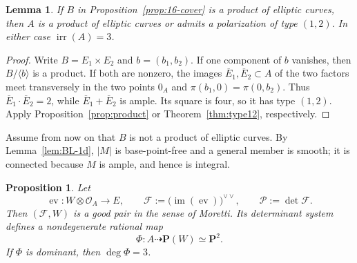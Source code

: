 \documentclass[12pt]{amsart}
\numberwithin{equation}{section}
\newtheorem{proposition}[theorem]{Proposition}
\newtheorem{lemma}[theorem]{Lemma}
\theoremstyle{definition}
\theoremstyle{remark}
\newcommand{\PP}{\mathbf P}
\newcommand{\irr}{\operatorname{irr}}
\begin{document}
\begin{lemma}\label{lem:16-product-cover}
If $B$ in Proposition~\ref{prop:16-cover} is a product of elliptic
curves, then $A$ is a product of elliptic curves or admits a
polarization of type $(1,2)$.  In either case $\irr(A)=3$.
\end{lemma}

\begin{proof}
Write $B=E_1\times E_2$ and $b=(b_1,b_2)$.  If one component of $b$
vanishes, then $B/\langle b\rangle$ is a product.  If both are nonzero,
the images $\overline E_1,\overline E_2\subset A$ of the two factors
meet transversely in the two points
$0_A$ and $\pi(b_1,0)=\pi(0,b_2)$.  Thus
$\overline E_1\cdot\overline E_2=2$, while
$\overline E_1+\overline E_2$ is ample.  Its square is four, so it has
type $(1,2)$.  Apply Proposition~\ref{prop:product} or
Theorem~\ref{thm:type12}, respectively.
\end{proof}

Assume from now on that $B$ is not a product of elliptic curves.  By
Lemma~\ref{lem:BL-1d}, $|M|$ is base-point-free and a general member is
smooth; it is connected because $M$ is ample, and hence is integral.

\begin{proposition}\label{prop:16-good-pair}
Let
\[
 \operatorname{ev}:W\otimes\mathcal O_A\longrightarrow E,
 \qquad
 \mathcal F:=\bigl(\operatorname{im}(\operatorname{ev})\bigr)^{\vee\vee},
 \qquad \mathcal P:=\det\mathcal F.
\]
Then $(\mathcal F,W)$ is a good pair in the sense of Moretti.  Its
determinant system defines a nondegenerate rational map
\[
 \Phi:A\dashrightarrow\PP(W)\simeq\PP^2.
\]
If $\Phi$ is dominant, then $\deg\Phi=3$.
\end{proposition}
\end{document}
